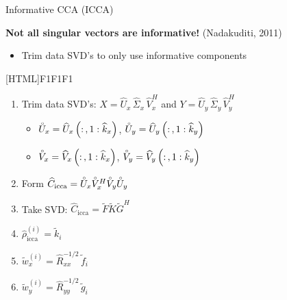 \documentclass[8pt]{beamer}
\newcommand{\Uxcir}{\accentset{\circ}{U}_x}
\newcommand{\Uycir}{\accentset{\circ}{U}_y}
\newcommand{\Vxcir}{\accentset{\circ}{V}_x}
\newcommand{\Vycir}{\accentset{\circ}{V}_y}
\newcommand{\Ciccahat}{\widehat{C}_{\text{icca}}}
\begin{document}
\begin{frame}{Informative CCA (ICCA)}

  \small

  \textbf{Not all singular vectors are informative!} (Nadakuditi, 2011)
  \begin{itemize}
  \item Trim data SVD's to only use informative components
  \end{itemize}

  \vspace{2ex}

  [HTML]{F1F1F1}{\parbox{0.9\textwidth}{%
  \begin{enumerate}
    \itemsep=1ex
  \item Trim data SVD's: $X=\widehat{U}_x\,\widehat{\Sigma}_x\,\widehat{V}_x^H$ and $Y=\widehat{U}_y\,\widehat{\Sigma}_y\, \widehat{V}_y^H$
    \begin{itemize}
    \item $\Uxcir = \widehat{U}_x\left(:\,,1:\widehat{k}_x\right)$, $\Uycir = \widehat{U}_y\left(:\,,1:\widehat{k}_y\right)$
    \item $\Vxcir = \widehat{V}_x\left(:\,,1:\widehat{k}_x\right)$, $\Vycir = \widehat{V}_y\left(:\,,1:\widehat{k}_y\right)$
    \end{itemize}

  \item Form
    $\Ciccahat=\Uxcir\Vxcir^H\Vycir\Uycir$
  \item Take SVD: $\Ciccahat = \widetilde{F}\widetilde{K}\widetilde{G}^H$
  \item $\widehat{\rho}_{\text{icca}}^{(i)} = \widetilde{k}_i$
  \item $\widetilde{w}_x^{(i)}=\widehat{R}_{xx}^{-1/2}\,\widetilde{f}_i$
  \item $\widetilde{w}_y^{(i)}=\widehat{R}_{yy}^{-1/2}\,\widetilde{g}_i$
  \end{enumerate}}}

\end{frame}
\end{document}
